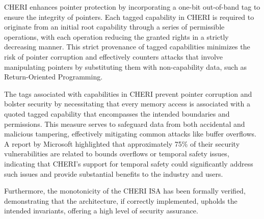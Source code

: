 CHERI enhances pointer protection by incorporating a one-bit out-of-band tag to ensure the integrity of pointers. Each tagged capability in CHERI is required to originate from an initial root capability through a series of permissible 
operations, with each operation reducing the granted rights in a strictly decreasing manner. This strict provenance of tagged capabilities minimizes the 
risk of pointer corruption and effectively counters attacks that 
involve manipulating pointers by substituting them with non-capability data, such as Return-Oriented Programming.
\newline

The tags associated with capabilities in CHERI prevent pointer corruption and bolster security by necessitating that every memory access is 
associated with a quoted tagged capability that encompasses the intended boundaries and permissions. This measure serves to safeguard data 
from both accidental and malicious tampering, effectively mitigating common attacks like buffer overflows. A report by Microsoft\cite{noauthor_msrc-security-researchpapers2020security_nodate} highlighted that 
approximately 75\% of their security vulnerabilities are related to bounds overflows or temporal safety issues, indicating that CHERI's support for temporal safety 
could significantly address such issues and provide substantial benefits to the industry and users.
\newline

Furthermore, the monotonicity of the CHERI ISA\cite{} has been formally verified\cite{zaliva_formal_2024}, demonstrating that the architecture, if correctly implemented, upholds the 
intended invariants, offering a high level of security assurance.
\newline


